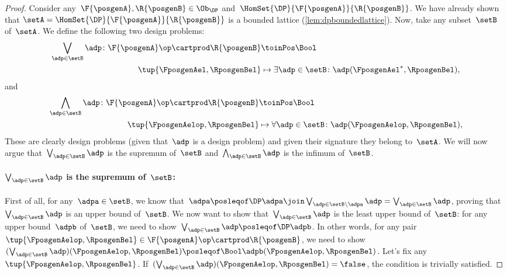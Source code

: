 \begin{proof}
    Consider any~$\F{\posgenA},\R{\posgenB}\in \Ob_\DP$ and~$\HomSet{\DP}{\F{\posgenA}}{\R{\posgenB}}$.
    We have already shown that $\setA=\HomSet{\DP}{\F{\posgenA}}{\R{\posgenB}}$ is a bounded lattice (\cref{lem:dpboundedlattice}).
    Now, take any subset~$\setB$ of~$\setA$.
    We define the following two design problems:
    \begin{equation*}
        \begin{aligned}
            \bigvee_{\adp \in \setB} \adp\colon \F{\posgenA}\op \cartprod \R{\posgenB} & \toinPos \Bool \\
            \tup{\FposgenAel,\RposgenBel}                                              & \mapsto \exists \adp\in \setB\colon \adp(\FposgenAel^*,\RposgenBel),
        \end{aligned}
    \end{equation*}
    and
    \begin{equation*}
        \begin{aligned}
            \bigwedge_{\adp \in \setB} \adp\colon \F{\posgenA}\op \cartprod \R{\posgenB} & \toinPos \Bool \\
            \tup{\FposgenAelop,\RposgenBel}                                              & \mapsto \forall \adp\in \setB\colon \adp(\FposgenAelop,\RposgenBel),
        \end{aligned}
    \end{equation*}
    These are clearly design problems (given that~$\adp$ is a design problem) and given their signature they belong to~$\setA$.
    We will now argue that~$\bigvee_{\adp \in \setB} \adp$ is the supremum of~$\setB$ and~$\bigwedge_{\adp \in \setB} \adp$ is the infimum of~$\setB$.
    \paragraph*{$\bigvee_{\adp \in \setB} \adp$ is the supremum of~$\setB$:}
    First of all, for any~$\adpa\in \setB$, we know that~$\adpa\posleqof\DP \adpa \join \bigvee_{\adp \in \setB \backslash \adpa} \adp= \bigvee_{\adp \in \setB} \adp$, proving that~$\bigvee_{\adp \in \setB} \adp$ is an upper bound of~$\setB$.
    We now want to show that~$\bigvee_{\adp \in \setB} \adp$ is the least upper bound of~$\setB$: for any upper bound~$\adpb$ of~$\setB$, we need to show~$\bigvee_{\adp \in \setB} \adp \posleqof\DP\adpb$.
    In other words, for any pair~$\tup{\FposgenAelop,\RposgenBel}\in \F{\posgenA}\op\cartprod \R{\posgenB}$, we need to show~$(\bigvee_{\adp \in \setB} \adp)(\FposgenAelop,\RposgenBel)\posleqof\Bool \adpb(\FposgenAelop,\RposgenBel)$.
    Let's fix any~$\tup{\FposgenAelop,\RposgenBel}$.
    If~$(\bigvee_{\adp \in \setB} \adp)(\FposgenAelop,\RposgenBel)=\false$, the condition is trivially satisfied.


\end{proof}

